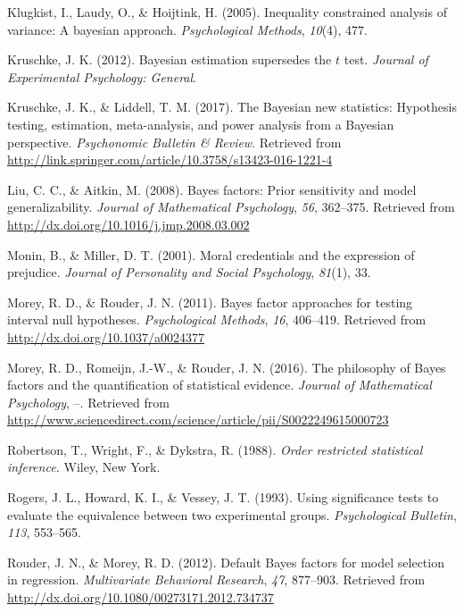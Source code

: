 \documentclass[english,man]{apa6}
\theoremstyle{definition}
\theoremstyle{definition}
\theoremstyle{remark}
\begin{document}
\hypertarget{ref-Klugkist:etal:2005}{}
Klugkist, I., Laudy, O., \& Hoijtink, H. (2005). Inequality constrained
analysis of variance: A bayesian approach. \emph{Psychological Methods},
\emph{10}(4), 477.

\hypertarget{ref-Kruschke:2012}{}
Kruschke, J. K. (2012). Bayesian estimation supersedes the \(t\) test.
\emph{Journal of Experimental Psychology: General}.

\hypertarget{ref-Kruschke:Liddell:2017}{}
Kruschke, J. K., \& Liddell, T. M. (2017). The Bayesian new statistics:
Hypothesis testing, estimation, meta-analysis, and power analysis from a
Bayesian perspective. \emph{Psychonomic Bulletin \& Review}. Retrieved
from \url{http://link.springer.com/article/10.3758/s13423-016-1221-4}

\hypertarget{ref-Liu:Aitkin:2008}{}
Liu, C. C., \& Aitkin, M. (2008). Bayes factors: Prior sensitivity and
model generalizability. \emph{Journal of Mathematical Psychology},
\emph{56}, 362--375. Retrieved from
\url{http://dx.doi.org/10.1016/j.jmp.2008.03.002}

\hypertarget{ref-Monin:Miller:2001}{}
Monin, B., \& Miller, D. T. (2001). Moral credentials and the expression
of prejudice. \emph{Journal of Personality and Social Psychology},
\emph{81}(1), 33.

\hypertarget{ref-Morey:Rouder:2011}{}
Morey, R. D., \& Rouder, J. N. (2011). Bayes factor approaches for
testing interval null hypotheses. \emph{Psychological Methods},
\emph{16}, 406--419. Retrieved from
\url{http://dx.doi.org/10.1037/a0024377}

\hypertarget{ref-Morey:etal:2016}{}
Morey, R. D., Romeijn, J.-W., \& Rouder, J. N. (2016). The philosophy of
Bayes factors and the quantification of statistical evidence.
\emph{Journal of Mathematical Psychology}, --. Retrieved from
\url{http://www.sciencedirect.com/science/article/pii/S0022249615000723}

\hypertarget{ref-Robertson:etal:1988}{}
Robertson, T., Wright, F., \& Dykstra, R. (1988). \emph{Order restricted
statistical inference.} Wiley, New York.

\hypertarget{ref-Rogers:etal:1993}{}
Rogers, J. L., Howard, K. I., \& Vessey, J. T. (1993). Using
significance tests to evaluate the equivalence between two experimental
groups. \emph{Psychological Bulletin}, \emph{113}, 553--565.

\hypertarget{ref-Rouder:Morey:2012}{}
Rouder, J. N., \& Morey, R. D. (2012). Default Bayes factors for model
selection in regression. \emph{Multivariate Behavioral Research},
\emph{47}, 877--903. Retrieved from
\url{http://dx.doi.org/10.1080/00273171.2012.734737}
\end{document}
